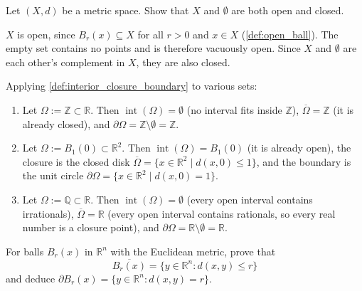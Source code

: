 \begin{exercise}
\label{ex:X_empty_clopen}
Let $(X,d)$ be a metric space. Show that $X$ and $\emptyset$ are both open and closed.
\end{exercise}

\begin{exercisesolution}
$X$ is open, since $B_r(x) \subseteq X$ for all $r > 0$ and $x \in X$
(\cref{def:open_ball}). The empty set contains no
points and is therefore vacuously open. Since $X$ and $\emptyset$ are each other's complement in
$X$, they are also closed.
\end{exercisesolution}

\begin{example}
\label{ex:interior_closure_boundary_more}
Applying \cref{def:interior_closure_boundary} to various sets:
\begin{enumerate}[label=\textbf{(\alph*)}]
  \item Let $\Omega := \mathbb{Z} \subset \mathbb{R}$. Then $\operatorname{int}(\Omega) = \emptyset$ (no interval fits inside $\mathbb{Z}$), $\overline{\Omega} = \mathbb{Z}$ (it is already closed), and $\partial\Omega = \mathbb{Z} \setminus \emptyset = \mathbb{Z}$.
  \item Let $\Omega := B_1(0) \subset \mathbb{R}^2$. Then $\operatorname{int}(\Omega) = B_1(0)$ (it is already open), the closure is the closed disk $\overline{\Omega} = \{x \in \mathbb{R}^2 \mid d(x,0) \leq 1\}$, and the boundary is the unit circle $\partial\Omega = \{x \in \mathbb{R}^2 \mid d(x,0) = 1\}$.
  \item Let $\Omega := \mathbb{Q} \subset \mathbb{R}$. Then $\operatorname{int}(\Omega) = \emptyset$ (every open interval contains irrationals), $\overline{\Omega} = \mathbb{R}$ (every open interval contains rationals, so every real number is a closure point), and $\partial\Omega = \mathbb{R} \setminus \emptyset = \mathbb{R}$.
\end{enumerate}
\end{example}

\begin{exercise}
\label{ex:closure_boundary_of_ball}
For balls $B_r(x)$ in $\mathbb{R}^n$ with the Euclidean metric, prove that
\[\overline{B_r(x)} = \{y \in \mathbb{R}^n : d(x,y) \leq r\}\]
and deduce $\partial B_r(x) = \{y \in \mathbb{R}^n : d(x,y) = r\}$.
\end{exercise}

